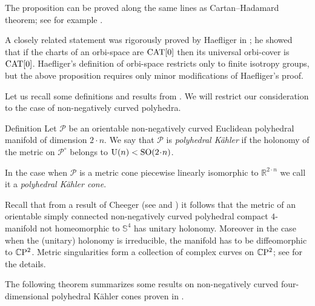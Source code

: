 \documentclass[oneside,a4paper]{article}
\begin{document}
The proposition can be proved along the same lines as Cartan--Hadamard theorem;
see for example \cite{akp}.

A closely related statement was rigorously proved by Haefliger in \cite{haefliger};
he showed that if the charts of an orbi-space are $\mathrm{CAT}[0]$
then its universal orbi-cover is $\mathrm{CAT}[0]$.
Haefliger's definition of orbi-space restricts only to finite isotropy groups, but the above proposition requires only minor modifications of  Haefliger's  proof.

Let us recall some definitions and results
from \cite{panov}.
We will restrict our consideration to the case of non-negatively curved polyhedra.

\begin{thm}{Definition}\label{PKdefinition} Let $\mathcal{P}$ be an orientable non-negatively curved Euclidean
polyhedral manifold of dimension $2{\cdot}n$.
We say that  $\mathcal{P}$ is
\emph{polyhedral K\"ahler} if the holonomy of the metric
on $\mathcal{P}^\circ$ belongs to
$\mathrm{U}(n)< \SO(2{\cdot}n)$.

In the case  when $\mathcal{P}$ is a metric cone
piecewise linearly isomorphic to $\mathbb R^{2\cdot n}$ we call it a \emph{polyhedral K\"ahler cone}.
\end{thm}

Recall that from a result of Cheeger (see \cite{cheeger} and \cite[Proposition 2.3]{panov})
it follows that the metric of an orientable simply connected non-negatively curved polyhedral
compact $4$-manifold not homeomorphic to $\mathbb{S}^4$ has unitary holonomy.
Moreover in the case when the (unitary) holonomy is irreducible,
the manifold has to be diffeomorphic to $\mathbb{C}\mathrm{P}^2$. Metric singularities
form a collection of complex curves on $\mathbb{C}\mathrm{P}^2$;
see \cite{panov} for the details.

The following theorem summarizes some results on non-negatively
curved four-dimensional polyhedral K\"ahler cones proven in \cite[Theorems 1.5, 1.7 and 1.8]{panov}.
\end{document}
